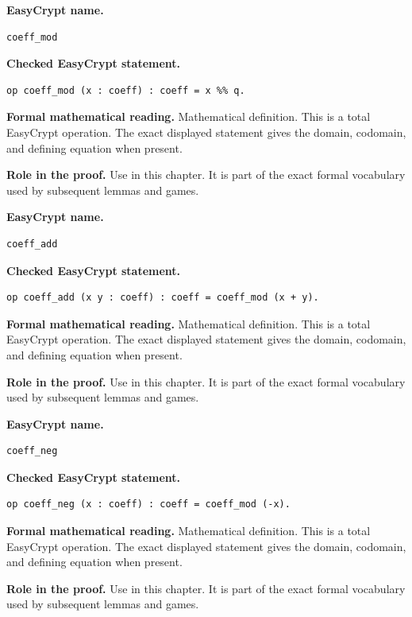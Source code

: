 \begin{formaldefinition}
\noindent\textbf{EasyCrypt name.}
\begin{lstlisting}[language=EasyCrypt,basicstyle=\ttfamily\scriptsize]
coeff_mod
\end{lstlisting}
\noindent\textbf{Checked EasyCrypt statement.}
\begin{lstlisting}[language=EasyCrypt,basicstyle=\ttfamily\scriptsize]
op coeff_mod (x : coeff) : coeff = x %% q.
\end{lstlisting}
\noindent\textbf{Formal mathematical reading.}
Mathematical definition. This is a total EasyCrypt operation.  The exact displayed statement gives the domain, codomain, and defining equation when present.

\noindent\textbf{Role in the proof.}
Use in this chapter. It is part of the exact formal vocabulary used by subsequent lemmas and games.

\end{formaldefinition}

\begin{formaldefinition}
\noindent\textbf{EasyCrypt name.}
\begin{lstlisting}[language=EasyCrypt,basicstyle=\ttfamily\scriptsize]
coeff_add
\end{lstlisting}
\noindent\textbf{Checked EasyCrypt statement.}
\begin{lstlisting}[language=EasyCrypt,basicstyle=\ttfamily\scriptsize]
op coeff_add (x y : coeff) : coeff = coeff_mod (x + y).
\end{lstlisting}
\noindent\textbf{Formal mathematical reading.}
Mathematical definition. This is a total EasyCrypt operation.  The exact displayed statement gives the domain, codomain, and defining equation when present.

\noindent\textbf{Role in the proof.}
Use in this chapter. It is part of the exact formal vocabulary used by subsequent lemmas and games.

\end{formaldefinition}

\begin{formaldefinition}
\noindent\textbf{EasyCrypt name.}
\begin{lstlisting}[language=EasyCrypt,basicstyle=\ttfamily\scriptsize]
coeff_neg
\end{lstlisting}
\noindent\textbf{Checked EasyCrypt statement.}
\begin{lstlisting}[language=EasyCrypt,basicstyle=\ttfamily\scriptsize]
op coeff_neg (x : coeff) : coeff = coeff_mod (-x).
\end{lstlisting}
\noindent\textbf{Formal mathematical reading.}
Mathematical definition. This is a total EasyCrypt operation.  The exact displayed statement gives the domain, codomain, and defining equation when present.

\noindent\textbf{Role in the proof.}
Use in this chapter. It is part of the exact formal vocabulary used by subsequent lemmas and games.

\end{formaldefinition}

